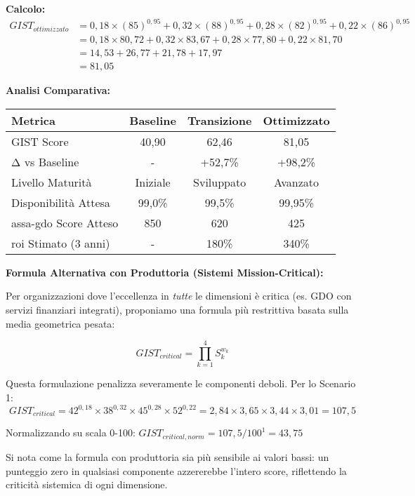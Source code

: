 \begin{tcolorbox}
\textbf{Calcolo:}
\begin{align}
GIST_{ottimizzato} &= 0,18 \times (85)^{0,95} + 0,32 \times (88)^{0,95} + 0,28 \times (82)^{0,95} + 0,22 \times (86)^{0,95} \\
&= 0,18 \times 80,72 + 0,32 \times 83,67 + 0,28 \times 77,80 + 0,22 \times 81,70 \\
&= 14,53 + 26,77 + 21,78 + 17,97 \\
&= \boxed{81,05}
\end{align}

\vspace{0.5cm}
\textbf{Analisi Comparativa:}

\begin{center}
\begin{tabular}{lccc}
\toprule
\textbf{Metrica} & \textbf{Baseline} & \textbf{Transizione} & \textbf{Ottimizzato} \\
\midrule
GIST Score & 40,90 & 62,46 & 81,05 \\
Δ vs Baseline & - & +52,7\% & +98,2\% \\
Livello Maturità & Iniziale & Sviluppato & Avanzato \\
Disponibilità Attesa & 99,0\% & 99,5\% & 99,95\% \\
\gls{assa-gdo} Score Atteso & 850 & 620 & 425 \\
\gls{roi} Stimato (3 anni) & - & 180\% & 340\% \\
\bottomrule
\end{tabular}
\end{center}

\vspace{0.5cm}
\textbf{Formula Alternativa con Produttoria (Sistemi Mission-Critical):}

Per organizzazioni dove l'eccellenza in \textit{tutte} le dimensioni è critica (es. GDO con servizi finanziari integrati), proponiamo una formula più restrittiva basata sulla media geometrica pesata:

$$GIST_{critical} = \prod_{k=1}^{4} S_k^{w_k}$$

Questa formulazione penalizza severamente le componenti deboli. Per lo Scenario 1:
$$GIST_{critical} = 42^{0,18} \times 38^{0,32} \times 45^{0,28} \times 52^{0,22} = 2,84 \times 3,65 \times 3,44 \times 3,01 = \boxed{107,5}$$

Normalizzando su scala 0-100: $GIST_{critical,norm} = 107,5 / 100^{1} = 43,75$

Si nota come la formula con produttoria sia più sensibile ai valori bassi: un punteggio zero in qualsiasi componente azzererebbe l'intero score, riflettendo la criticità sistemica di ogni dimensione.


\end{tcolorbox}
